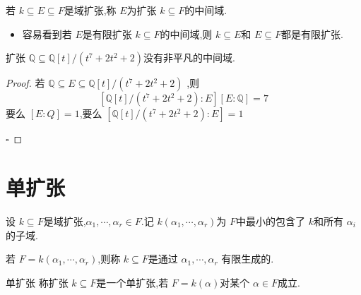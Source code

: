 \documentclass[lang=cn,12pt,color=green,fontset=none,pad]{elegantbook}
\begin{document}
\begin{definition}
    若 \(  k\subseteq E\subseteq F  \)是域扩张,称 \(  E  \)为扩张 \(  k\subseteq F  \)的中间域.   
\end{definition}

\begin{remark}
    \begin{itemize}
        \item 容易看到若 \(  E  \)是有限扩张 \(  k\subseteq F  \)的中间域,则 \(  k\subseteq E  \)和 \(  E\subseteq F  \)都是有限扩张.    
        
    \end{itemize}
    
\end{remark}

\hfill   


\begin{example}
    扩张 \(  \mathbb{Q} \subseteq \mathbb{Q} [t]/\left( t ^{7} + 2t ^{2}+ 2\right)   \)没有非平凡的中间域. 
\end{example}

\begin{proof}
    若 \(  \mathbb{Q} \subseteq E\subseteq \mathbb{Q} [t]/\left( t ^{7}+ 2t^{2}+ 2 \right)   \) ,则 \[
    [\mathbb{Q}[t] /\left( t^{7}+ 2t^{2}+ 2 \right) :E][E:\mathbb{Q} ]= 7
    \]要么 \(  [E:Q]=1  \),要么 \(  [\mathbb{Q}[t]/\left( t^{7}+ 2t^{2}+ 2 \right):E ]=1  \) 

    \hfill $\square$
\end{proof}

\section{单扩张}

\begin{definition}
    设 \(  k\subseteq F  \)是域扩张,\(   \alpha_{1},\cdots , \alpha _{r} \in F  \).记 \(  k\left(  \alpha _{1},\cdots , \alpha _{r} \right)   \)为 \(  F  \)中最小的包含了 \(  k  \)和所有 \(  \alpha _{i}  \)      的子域.

    若 \(  F=k\left(  \alpha _{1},\cdots ,\alpha _{r} \right)   \),则称 \(  k\subseteq F  \)是通过 \(  \alpha _{1},\cdots ,\alpha _{r}  \)   有限生成的.
\end{definition}

\begin{definition}{单扩张}
    称扩张 \(  k\subseteq F  \)是一个单扩张,若 \(  F=k\left(  \alpha  \right)   \)对某个 \(  \alpha  \in F  \)成立.   
\end{definition}
\end{document}
